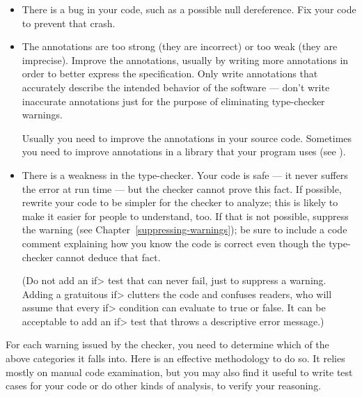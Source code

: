 \begin{itemize}
\item
  There is a bug in your code, such as a possible null dereference.  Fix
  your code to prevent that crash.

\item
  The annotations are too strong (they are incorrect) or too weak (they
  are imprecise).  Improve the
  annotations, usually by writing more annotations in order to better
  express the specification.
  Only write annotations that accurately describe the intended behavior of
  the software --- don't write inaccurate annotations just for the purpose
  of eliminating type-checker warnings.

  Usually you need to improve the annotations in your source code.
  Sometimes you need to improve annotations in a library that your program
  uses (see ).

\item
  There is a weakness in the type-checker.  Your code is safe --- it never
  suffers the error at run time --- but the checker cannot prove this fact.
  If possible, rewrite your code to be simpler for the checker to analyze;
  this is likely to make it easier for people to understand, too.
  If that is not possible, suppress the warning (see
  Chapter~\ref{suppressing-warnings}); be sure to include a code
  comment explaining how you know the code is correct even though the
  type-checker cannot deduce that fact.

  (Do not add an \<if> test that can never fail, just to suppress a
  warning.  Adding a gratuitous \<if> clutters the code and confuses
  readers, who will assume that every \<if> condition can evaluate to true
  or false.  It can be acceptable to add an \<if> test that throws a
  descriptive error message.)
\end{itemize}

For each warning issued by the checker, you need to determine which of the
above categories it falls into.  Here is an effective methodology to do so.
It relies mostly on manual code examination, but you may also find it
useful to write test cases for your code or do other kinds of analysis, to
verify your reasoning.

